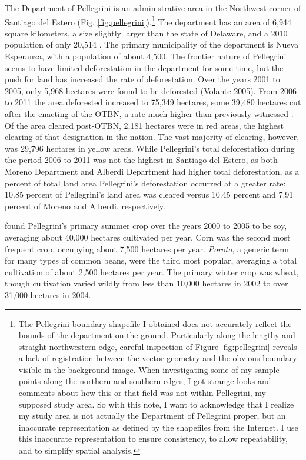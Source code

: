 The Department of Pellegrini is an administrative area in the Northwest corner of Santiago del Estero (Fig. \ref{fig:pellegrini}).\footnote{The Pellegrini boundary shapefile I obtained does not accurately reflect the bounds of the department on the ground. Particularly along the lengthy and straight northwestern edge, careful inspection of Figure \ref{fig:pellegrini} reveals a lack of registration between the vector geometry and the obvious boundary visible in the background image. When investigating some of my sample points along the northern and southern edges, I got strange looks and comments about how this or that field was not within Pellegrini, my supposed study area. So with this note, I want to acknowledge that I realize my study area is not actually the Department of Pellegrini proper, but an inaccurate representation as defined by the shapefiles from the Internet. I use this inaccurate representation to ensure consistency, to allow repeatability, and to simplify spatial analysis.} The department has an area of 6,944 square kilometers, a size slightly larger than the state of Delaware, and a 2010 population of only 20,514 \autocite{estadistica-y-c2010b}. The primary municipality of the department is Nueva Esperanza, with a population of about 4,500. The frontier nature of Pellegrini seems to have limited deforestation in the department for some time, but the push for land has increased the rate of deforestation. Over the years 2001 to 2005, only 5,968 hectares were found to be deforested (Volante 2005). From 2006 to 2011 the area deforested increased to 75,349 hectares, some 39,480 hectares cut after the enacting of the OTBN, a rate much higher than previously witnessed \autocite{secreteria-de-a2012monitoreo}. Of the area cleared post-OTBN, 2,181 hectares were in red areas, the highest clearing of that designation in the nation. The vast majority of clearing, however, was 29,796 hectares in yellow areas. While Pellegrini’s total deforestation during the period 2006 to 2011 was not the highest in Santiago del Estero, as both Moreno Department and Alberdi Department had higher total deforestation, as a percent of total land area Pellegrini’s deforestation occurred at a greater rate: 10.85 percent of Pellegrini’s land area was cleared versus 10.45 percent and 7.91 percent of Moreno and Alberdi, respectively.

\textcite{volante2005analisis} found Pellegrini's primary summer crop over the years 2000 to 2005 to be soy, averaging about 40,000 hectares cultivated per year. Corn was the second most frequent crop, occupying about 7,500 hectares per year. \textit{Poroto}, a generic term for many types of common beans, were the third most popular, averaging a total cultivation of about 2,500 hectares per year. The primary winter crop was wheat, though cultivation varied wildly from less than 10,000 hectares in 2002 to over 31,000 hectares in 2004.
